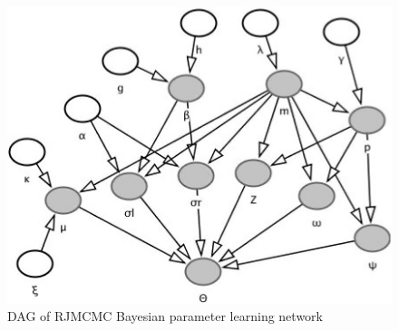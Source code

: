\documentclass[conference]{IEEEtran}
\begin{document}
\begin{figure}[b]
\centering
\includegraphics[width=0.4\paperwidth]{DAG_feature.jpg}
\caption{DAG of RJMCMC Bayesian parameter learning network}
\label{fig:1}
\end{figure}
\end{document}
